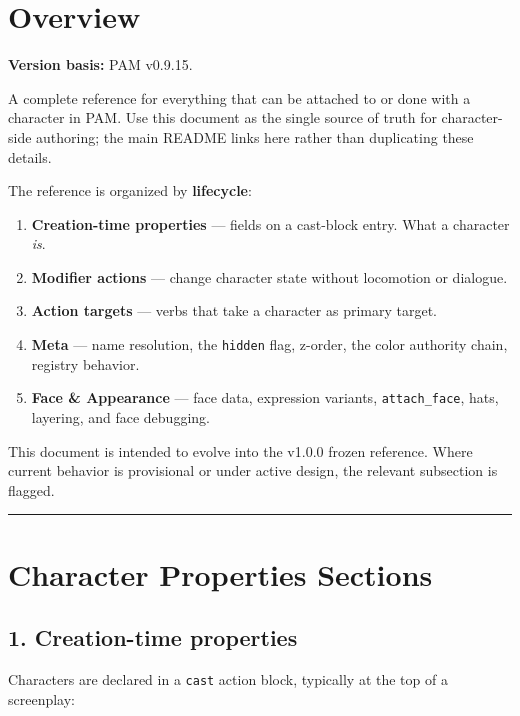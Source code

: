 \documentclass[
  12pt,
  letterpaper,
]{book}
\providecommand{\tightlist}{%
  \setlength{\itemsep}{0pt}\setlength{\parskip}{0pt}}
\begin{document}
\section{Overview}\label{overview-1}

\textbf{Version basis:} PAM v0.9.15.

A complete reference for everything that can be attached to or done with
a character in PAM. Use this document as the single source of truth for
character-side authoring; the main README links here rather than
duplicating these details.

The reference is organized by \textbf{lifecycle}:

\begin{enumerate}
\def\labelenumi{\arabic{enumi}.}
\tightlist
\item
  \textbf{Creation-time properties} --- fields on a cast-block entry.
  What a character \emph{is}.
\item
  \textbf{Modifier actions} --- change character state without
  locomotion or dialogue.
\item
  \textbf{Action targets} --- verbs that take a character as primary
  target.
\item
  \textbf{Meta} --- name resolution, the \texttt{hidden} flag, z-order,
  the color authority chain, registry behavior.
\item
  \textbf{Face \& Appearance} --- face data, expression variants,
  \texttt{attach\_face}, hats, layering, and face debugging.
\end{enumerate}

This document is intended to evolve into the v1.0.0 frozen reference.
Where current behavior is provisional or under active design, the
relevant subsection is flagged.

\begin{center}\rule{0.5\linewidth}{0.5pt}\end{center}

\section{Character Properties
Sections}\label{character-properties-sections}

\subsection{1. Creation-time properties}\label{creation-time-properties}

Characters are declared in a \texttt{cast} action block, typically at
the top of a screenplay:
\end{document}
